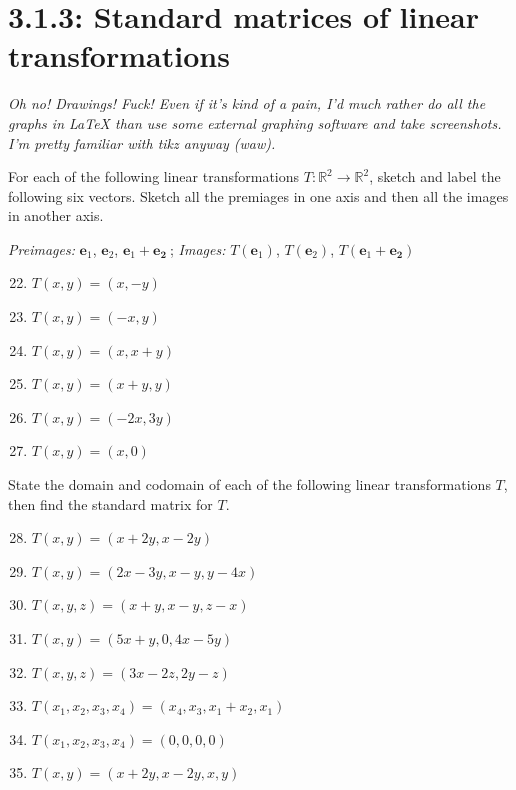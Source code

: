 \documentclass{article}
\begin{document}
\section*{3.1.3: Standard matrices of linear transformations}
\textit{Oh no! Drawings! Fuck! Even if it's kind of a pain, I'd much rather do all the graphs in \LaTeX{} than use some external graphing software and take screenshots. I'm pretty familiar with tikz anyway (waw). }
\begin{center}
    \colorbox{CornflowerBlue!50}{
    \begin{minipage}[c]{0.9\textwidth}
        \centering
        For each of the following linear transformations \(T: \mathbb{R}^2 \to \mathbb{R}^2\), sketch and label the following six vectors. Sketch all the premiages in one axis and then all the images in another axis.\par 
        \textit{Preimages: } \(\mathbf{e}_1\), \(\mathbf{e}_2\), \(\mathbf{e}_1 + \mathbf{e_2}~\); \textit{Images: } \(T(\mathbf{e}_1)\), \(T(\mathbf{e}_2)\), \(T(\mathbf{e}_1 + \mathbf{e_2})\)
    \end{minipage}
    }
\end{center}
\begin{enumerate}
    \setcounter{enumi}{21}
    \item \(T(x,y) = (x,-y)\)
    \item \(T(x,y) = (-x,y)\)
    \item \(T(x,y) = (x,x+y)\)
    \item \(T(x,y) = (x+y,y)\)
    \item \(T(x,y) = (-2x,3y)\)
    \item \(T(x,y) = (x,0)\)
\end{enumerate}
\begin{center}
    \colorbox{CornflowerBlue!50}{
    \begin{minipage}[c]{0.9\textwidth}
        \centering
        State the domain and codomain of each of the following linear transformations \(T\), then find the standard matrix for \(T\).
    \end{minipage}
    }
\end{center}
\begin{enumerate}
    \setcounter{enumi}{27}
    \item \(T(x,y) = (x+2y, x-2y)\)
    \item \(T(x,y) = (2x-3y,x-y,y-4x)\)
    \item \(T(x,y,z) = (x+y, x-y, z-x)\)
    \item \(T(x,y) = (5x+y,0,4x-5y)\)
    \item \(T(x,y,z) = (3x-2z,2y-z)\)
    \item \(T(x_1,x_2,x_3,x_4) = (x_4,x_3,x_1 + x_2,x_1)\)
    \item \(T(x_1,x_2,x_3,x_4) = (0,0,0,0)\)
    \item \(T(x,y) = (x+2y, x-2y, x,y)\)
\end{enumerate}
\end{document}
